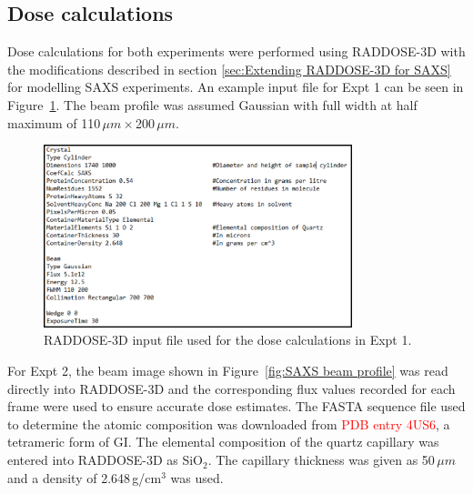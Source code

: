 \subsection{Dose calculations}
\label{sub:Dose calculation}
Dose calculations for both experiments were performed using RADDOSE-3D with the modifications described in section \ref{sec:Extending RADDOSE-3D for SAXS} for modelling SAXS experiments.
An example input file for Expt 1 can be seen in Figure~\ref{fig:SAXS example input - Rebecca}.
The beam profile was assumed Gaussian with full width at half maximum of 110$\,\mu m \times $200$\,\mu m$.
\begin{figure}
    \centering
    \includegraphics[width=0.8\textwidth]{figures/saxs/rebecca_raddose_input.png}
    \caption{RADDOSE-3D input file used for the dose calculations in Expt 1.}
    \label{fig:SAXS example input - Rebecca}
\end{figure}

For Expt 2, the beam image shown in Figure~\ref{fig:SAXS beam profile} was read directly into RADDOSE-3D and the corresponding flux values recorded for each frame were used to ensure accurate dose estimates.
The FASTA sequence file used to determine the atomic composition was downloaded from \textcolor{red}{PDB entry 4US6}, a tetrameric form of GI.
The elemental composition of the quartz capillary was entered into RADDOSE-3D as SiO$_{\text{2}}$.
The capillary thickness was given as 50$\,\mu m$ and a density of 2.648$\,$g/cm$^{\text{3}}$ was used.
